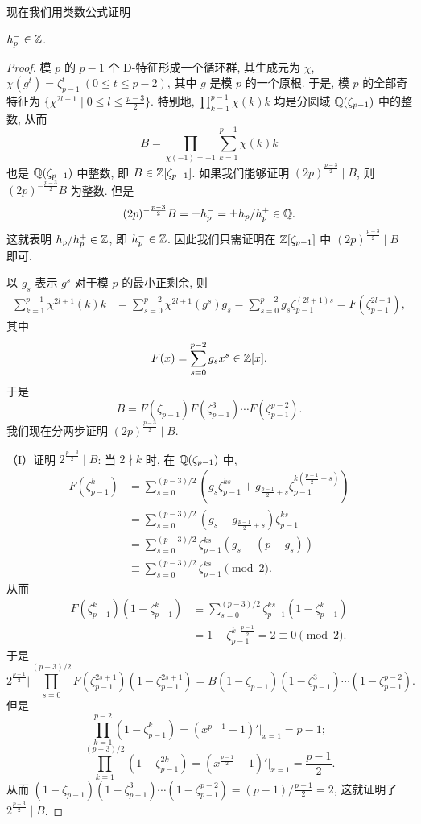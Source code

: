 现在我们用类数公式证明

\begin{theorem}\label{thm:6.5}
$h_p^-\in\mathbb{Z}$.
\end{theorem}

\begin{proof}
模 $p$ 的 $p-1$ 个 D-特征形成一个循环群, 其生成元为 $\chi$, $\chi(g^t)=\zeta_{p-1}^t\ (0\leqslant t\leqslant p-2)$, 其中 $g$ 是模 $p$ 的一个原根. 于是, 模 $p$ 的全部奇特征为 $\{\chi^{2l+1}\mid 0\leqslant l\leqslant\frac{p-3}{2}\}$. 特别地, $\prod_{k=1}^{p-1}\chi(k)k$ 均是分圆域 $\mathbb{Q}(\zeta_{p-1})$ 中的整数, 从而
\[
  B=\prod_{\chi(-1)=-1}\sum_{k=1}^{p-1}\chi(k)k
\]
也是 $\mathbb{Q}(\zeta_{p-1})$ 中整数, 即 $B\in\mathbb{Z}[\zeta_{p-1}]$. 如果我们能够证明 $(2p)^{\frac{p-3}{2}}\mid B$, 则 $(2p)^{-\frac{p-3}{2}}B$ 为整数. 但是
\[
  (2p)^{-\frac{p-3}{2}}B=\pm h_p^-=\pm h_p/h_p^+\in\mathbb{Q}.
\]
这就表明 $h_p/h_p^+\in\mathbb{Z}$, 即 $h_p^-\in\mathbb{Z}$. 因此我们只需证明在 $\mathbb{Z}[\zeta_{p-1}]$ 中 $(2p)^{\frac{p-3}{2}}\mid B$ 即可.

以 $g_s$ 表示 $g^s$ 对于模 $p$ 的最小正剩余, 则
\begin{align*}
  \sum_{k=1}^{p-1}\chi^{2l+1}(k)k&=\sum_{s=0}^{p-2}\chi^{2l+1}(g^s)g_s
  =\sum_{s=0}^{p-2}g_s\zeta_{p-1}^{(2l+1)s}=F(\zeta_{p-1}^{2l+1}),
\end{align*}
其中
\[
  F(x)=\sum_{s=0}^{p-2}g_sx^s\in\mathbb{Z}[x].
\]
于是
\[
  B=F(\zeta_{p-1})F(\zeta_{p-1}^3)\cdots F(\zeta_{p-1}^{p-2}).
\]
我们现在分两步证明 $(2p)^{\frac{p-3}{2}}\mid B$.

（I）证明 $2^{\frac{p-3}{2}}\mid B$: 当 $2\nmid k$ 时, 在 $\mathbb{Q}(\zeta_{p-1})$ 中,
\begin{align*}
  F(\zeta_{p-1}^k)&=\sum_{s=0}^{(p-3)/2}\left(g_s\zeta_{p-1}^{ks}+g_{\frac{p-1}{2}+s}\zeta_{p-1}^{k(\frac{p-1}{2}+s)}\right)\\
  &=\sum_{s=0}^{(p-3)/2}\left(g_s-g_{\frac{p-1}{2}+s}\right)\zeta_{p-1}^{ks}\\
  &=\sum_{s=0}^{(p-3)/2}\zeta_{p-1}^{ks}\left(g_s-(p-g_s)\right)\\
  &\equiv\sum_{s=0}^{(p-3)/2}\zeta_{p-1}^{ks}\pmod{2}.
\end{align*}
从而
\begin{align*}
  F(\zeta_{p-1}^k)(1-\zeta_{p-1}^k)&\equiv\sum_{s=0}^{(p-3)/2}\zeta_{p-1}^{ks}(1-\zeta_{p-1}^k)\\
  &=1-\zeta_{p-1}^{k\cdot\frac{p-1}{2}}=2\equiv 0\pmod{2}.
\end{align*}
于是
\[
  2^{\frac{p-1}{2}}\Big|\prod_{s=0}^{(p-3)/2}F(\zeta_{p-1}^{2s+1})(1-\zeta_{p-1}^{2s+1})
  =B(1-\zeta_{p-1})(1-\zeta_{p-1}^3)\cdots(1-\zeta_{p-1}^{p-2}).
\]
但是
\[
  \prod_{k=1}^{p-2}(1-\zeta_{p-1}^k)=(x^{p-1}-1)'\Big|_{x=1}=p-1;
\]
\[
  \prod_{k=1}^{(p-3)/2}(1-\zeta_{p-1}^{2k})=(x^{\frac{p-1}{2}}-1)'\Big|_{x=1}=\frac{p-1}{2}.
\]
从而 $(1-\zeta_{p-1})(1-\zeta_{p-1}^3)\cdots(1-\zeta_{p-1}^{p-2})=(p-1)\big/\frac{p-1}{2}=2$, 这就证明了 $2^{\frac{p-3}{2}}\mid B$.


\end{proof}
